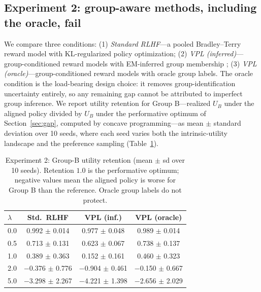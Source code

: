 ﻿\documentclass[11pt]{article}
\begin{document}
\subsection{Experiment 2: group-aware methods, including the oracle, fail}

We compare three conditions: (1) \emph{Standard RLHF}---a pooled Bradley--Terry reward model with KL-regularized policy optimization; (2) \emph{VPL (inferred)}---group-conditioned reward models with EM-inferred group membership \citep{poddar2024}; (3) \emph{VPL (oracle)}---group-conditioned reward models with oracle group labels. The oracle condition is the load-bearing design choice: it removes group-identification uncertainty entirely, so any remaining gap cannot be attributed to imperfect group inference. We report utility retention for Group B---realized \(U_B\) under the aligned policy divided by \(U_B\) under the performative optimum of Section~\ref{sec:gap}, computed by concave programming---as mean \(\pm\) standard deviation over 10 seeds, where each seed varies both the intrinsic-utility landscape and the preference sampling (Table~\ref{tab:retention}).

\begin{table}[t]
\centering
\small
\setlength{\tabcolsep}{3pt}
\begin{tabular}{@{}lccc@{}}
\toprule
$\lambda$ & Std.\ RLHF & VPL (inf.) & VPL (oracle) \\
\midrule
0.0 & 0.992 $\pm$ 0.014 & 0.977 $\pm$ 0.048 & 0.989 $\pm$ 0.014 \\
0.5 & 0.713 $\pm$ 0.131 & 0.623 $\pm$ 0.067 & 0.738 $\pm$ 0.137 \\
1.0 & 0.389 $\pm$ 0.363 & 0.152 $\pm$ 0.161 & 0.460 $\pm$ 0.323 \\
2.0 & $-$0.376 $\pm$ 0.776 & $-$0.904 $\pm$ 0.461 & $-$0.150 $\pm$ 0.667 \\
5.0 & $-$3.298 $\pm$ 2.267 & $-$4.221 $\pm$ 1.398 & $-$2.656 $\pm$ 2.029 \\
\bottomrule
\end{tabular}
\caption{Experiment 2: Group-B utility retention (mean \(\pm\) sd over 10 seeds). Retention \(1.0\) is the performative optimum; negative values mean the aligned policy is worse for Group B than the reference. Oracle group labels do not protect.}
\label{tab:retention}
\end{table}
\end{document}
